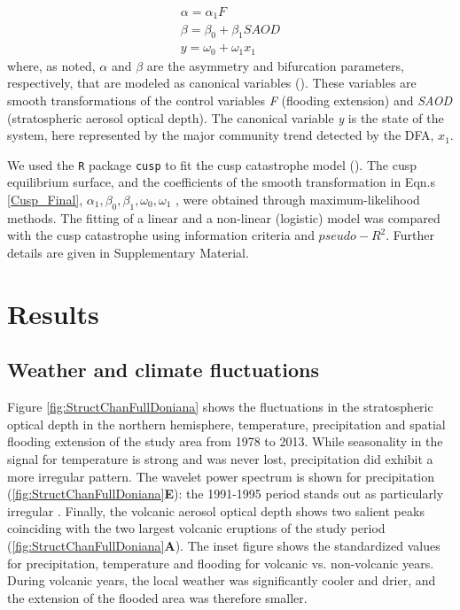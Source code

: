 \documentclass[12pt]{article}
\begin{document}
\begin{equation}\label{Cusp_Final}
	\begin{aligned}
		\alpha = \alpha_{1}F \\
		\beta = \beta_{0} + \beta_{1}SAOD \\
		y = \omega_{0} + \omega_{1}x_{1}
	\end{aligned}
\end{equation}
where, as noted, $\alpha$ and $\beta$ are the asymmetry and bifurcation parameters, respectively, that are modeled as canonical variables (\cite{Grasman2009}). These variables are smooth transformations of the control variables \textit{F} (flooding extension) and \textit{SAOD} (stratospheric aerosol optical depth). The canonical variable \textit{y} is the state of the system, here represented by the major community trend detected by the DFA, $x_{1}$.

We used the \verb|R| package \verb|cusp| to fit the cusp catastrophe model (\cite{Grasman2009}). The cusp equilibrium surface, and the coefficients of the smooth transformation in Eqn.s \ref{Cusp_Final}, $ \alpha_{1}, \beta_{0}, \beta_{1}, \omega_{0}, \omega_{1}  $ , were obtained through maximum-likelihood methods. The fitting of a linear and a non-linear (logistic) model was compared with the cusp catastrophe using information criteria and $ pseudo-R^{2} $. Further details are given in Supplementary Material. \\

\section*{Results}
\label{sec:Results}

\subsection*{Weather and climate fluctuations}
\label{subsec:WeathRes}

Figure \ref{fig:StructChanFullDoniana} shows the fluctuations in the stratospheric optical depth in the northern hemisphere, temperature, precipitation and spatial flooding extension of the study area from 1978 to 2013. While seasonality in the signal for temperature is strong and was never lost, precipitation did exhibit a more irregular pattern. The wavelet power spectrum is shown for precipitation (\ref{fig:StructChanFullDoniana}\textbf{E}): the 1991-1995 period stands out as particularly irregular . Finally, the volcanic aerosol optical depth shows two salient peaks coinciding with the two largest volcanic eruptions of the study period (\ref{fig:StructChanFullDoniana}\textbf{A}). The inset figure shows the standardized values for precipitation, temperature and flooding for volcanic vs. non-volcanic years. During volcanic years, the local weather was significantly cooler and drier, and the extension of the flooded area was therefore  smaller.
\end{document}
